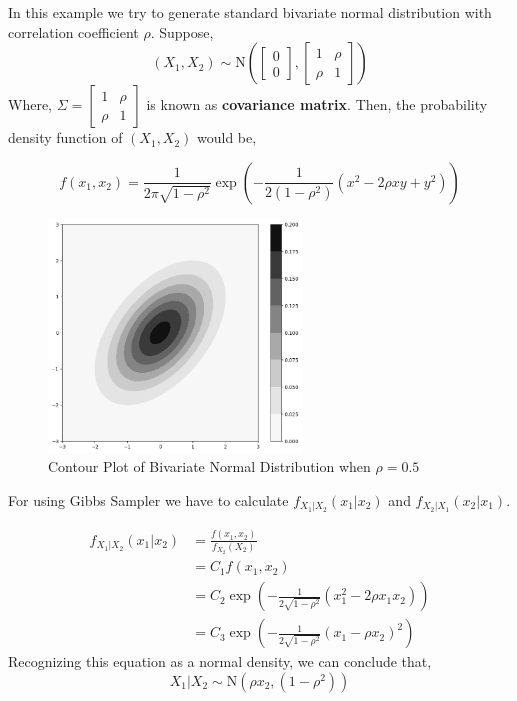 \begin{example}

    In this example we try to generate standard bivariate normal distribution with correlation coefficient $ \rho $. Suppose,
    \[
        (X_1, X_2) \sim \text{N}\left(  
            \begin{bmatrix}
                0\\
                0
            \end{bmatrix},
            \begin{bmatrix}
                1 & \rho \\ 
                \rho & 1
            \end{bmatrix}
        \right)
    \]
    Where, $ \Sigma = \begin{bmatrix}
        1 & \rho \\ 
        \rho & 1
    \end{bmatrix} $ is known as \textbf{covariance matrix}.  Then, the probability density function of $ (X_1,X_2) $ would be,

    \[
        f(x_1,x_2) = \frac{1}{2 \pi \sqrt{1-\rho^2}} \exp \left( - \frac{1}{2(1-\rho^2)} (x^2 -2 \rho xy + y^2  ) \right)
    \]
    
    \begin{figure}[H]
        \centering
        \includegraphics[width=0.6\textwidth]{images/gibbs/ex1-con-plot.png}
        \caption{Contour Plot of Bivariate Normal Distribution when $ \rho = 0.5 $}
    \end{figure}

    For using Gibbs Sampler we have to calculate $ f_{X_1|X_2}(x_1|x_2) $ and $ f_{X_2|X_1}(x_2|x_1) $.

    \begin{align*}
        f_{X_1|X_2}(x_1|x_2) &= \frac{f(x_1,x_2)}{f_{X_2}(X_2)} \\ 
                    &=C_1 f(x_1,x_2) \\
                    &=C_2 \exp \left( - \frac{1}{2 \sqrt{1-\rho^2}} (x_1^2 - 2 \rho x_1x_2) \right) \\
                    &= C_3 \exp \left(- \frac{1}{2 \sqrt{1-\rho^2}} (x_1 - \rho x_2)^2   \right)
    \end{align*}
     Recognizing this equation as a normal density, we can conclude that, 
     \[ X_1|X_2 \sim \text{N}(\rho x_2, (1-\rho^2)) \]


\end{example}
